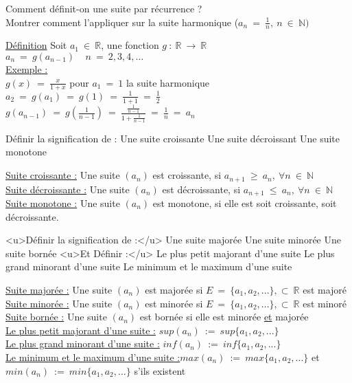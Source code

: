 \documentclass[12pt]{article}
\newcommand*{\xfield}[1]{\begin{mdframed}\centering #1\end{mdframed}\bigskip}
\newenvironment{note}{}{}
\begin{document}
\begin{note}
    \xfield{
        Comment définit-on une suite par récurrence ?\\
        Montrer comment l'appliquer sur la suite harmonique ($a_n\ =\ \frac{1}{n},\ n\ \in\ \mathbb{N})$
    }
    \xfield{
        \underline{Définition} Soit $a_1\ \in\ \mathbb{R}$, une fonction $g\ :\ \mathbb{R}\ \rightarrow\ \mathbb{R}$\\
        $a_n\ =\ g(a_{n-1})\ \ \ \ \ n\ =\ 2,3,4,...$\\
        \underline{Exemple : }\\
        $g(x)\ =\ \frac{x}{1+x}$ pour $a_1\ =\ 1$ la suite harmonique\\
        $a_2\ =\ g(a_1)\ =\ g(1)\ =\ \frac{1}{1+1}\ =\ \frac{1}{2}$\\
        $g(a_{n-1})\ =\ g(\frac{1}{n-1})\ =\ \frac{\frac{1}{n-1}}{1+ \frac{1}{n-1}}\ =\ \frac{1}{n}\ =\ a_n$}
\end{note}

\begin{note}
    \xfield{
        Définir la signification de :
        Une suite croissante
        Une suite décroissant
        Une suite monotone
    }
    \xfield{
        \underline{Suite croissante :} Une suite $(a_n)$ est croissante, si $a_{n+1}\ \ge\ a_n,\ \forall n\ \in\ \mathbb{N}$\\
        \underline{Suite décroissante :} Une suite $(a_n)$ est décroissante, si $a_{n+1}\ \le\ a_n,\ \forall n\ \in\ \mathbb{N}$\\
                \underline{Suite monotone :} Une suite $(a_n)$ est monotone, si elle est soit croissante, soit décroissante.}
\end{note}

\begin{note}
    \xfield{
        <u>Définir la signification de :</u>
        Une suite majorée
        Une suite minorée
        Une suite bornée
        <u>Et Définir :</u>
        Le plus petit majorant d'une suite
        Le plus grand minorant d'une suite
        Le minimum et le maximum d'une suite
    }
    \xfield{
        \underline{Suite majorée :} Une suite $(a_n)$ est majorée si $E\ =\ \{a_1,a_2,...\}, \subset\ \mathbb{R}$ est majoré\\
        \underline{Suite minorée :} Une suite $(a_n)$ est minorée si $E\ =\ \{a_1,a_2,...\}, \subset\ \mathbb{R}$ est minoré\\
        \underline{Suite bornée :} Une suite $(a_n)$ est bornée si elle est minorée \underline{et} majorée\\
        \underline{Le plus petit majorant d'une suite :} $sup(a_n)\ :=\ sup\{a_1,a_2,...\}$\\
        \underline{Le plus grand minorant d'une suite :} $inf(a_n)\ :=\ inf\{a_1,a_2,...\}$\\
        \underline{Le minimum et le maximum d'une suite :}$max(a_n)\ :=\ max\{a_1,a_2,...\}$ et $min(a_n)\ :=\ min\{a_1,a_2,...\}$ s'ils existent
    }
\end{note}
\end{document}
